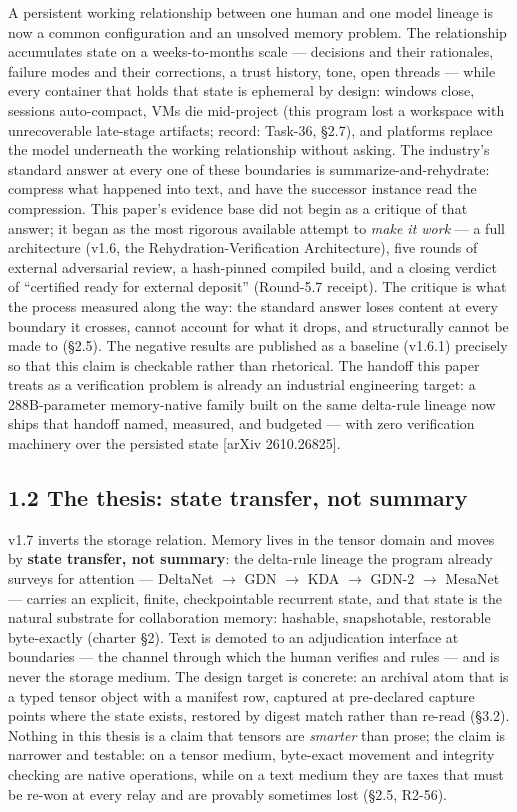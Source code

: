 \documentclass[11pt]{article}
\begin{document}
A persistent working relationship between one human and one model lineage is now a common configuration and an unsolved memory problem. The relationship accumulates state on a weeks-to-months scale --- decisions and their rationales, failure modes and their corrections, a trust history, tone, open threads --- while every container that holds that state is ephemeral by design: windows close, sessions auto-compact, VMs die mid-project (this program lost a workspace with unrecoverable late-stage artifacts; record: Task-36, \S{}2.7), and platforms replace the model underneath the working relationship without asking. The industry's standard answer at every one of these boundaries is summarize-and-rehydrate: compress what happened into text, and have the successor instance read the compression. This paper's evidence base did not begin as a critique of that answer; it began as the most rigorous available attempt to \emph{make it work} --- a full architecture (v1.6, the Rehydration-Verification Architecture), five rounds of external adversarial review, a hash-pinned compiled build, and a closing verdict of ``certified ready for external deposit'' (Round-5.7 receipt). The critique is what the process measured along the way: the standard answer loses content at every boundary it crosses, cannot account for what it drops, and structurally cannot be made to (\S{}2.5). The negative results are published as a baseline (v1.6.1) precisely so that this claim is checkable rather than rhetorical. The handoff this paper treats as a verification problem is already an industrial engineering target: a 288B-parameter memory-native family built on the same delta-rule lineage now ships that handoff named, measured, and budgeted --- with zero verification machinery over the persisted state {[}arXiv 2610.26825{]}.

\subsection{1.2 The thesis: state transfer, not summary}\label{the-thesis-state-transfer-not-summary}

v1.7 inverts the storage relation. Memory lives in the tensor domain and moves by \textbf{state transfer, not summary}: the delta-rule lineage the program already surveys for attention --- DeltaNet \(\to\) GDN \(\to\) KDA \(\to\) GDN-2 \(\to\) MesaNet --- carries an explicit, finite, checkpointable recurrent state, and that state is the natural substrate for collaboration memory: hashable, snapshotable, restorable byte-exactly (charter \S{}2). Text is demoted to an adjudication interface at boundaries --- the channel through which the human verifies and rules --- and is never the storage medium. The design target is concrete: an archival atom that is a typed tensor object with a manifest row, captured at pre-declared capture points where the state exists, restored by digest match rather than re-read (\S{}3.2). Nothing in this thesis is a claim that tensors are \emph{smarter} than prose; the claim is narrower and testable: on a tensor medium, byte-exact movement and integrity checking are native operations, while on a text medium they are taxes that must be re-won at every relay and are provably sometimes lost (\S{}2.5, R2-56).
\end{document}
